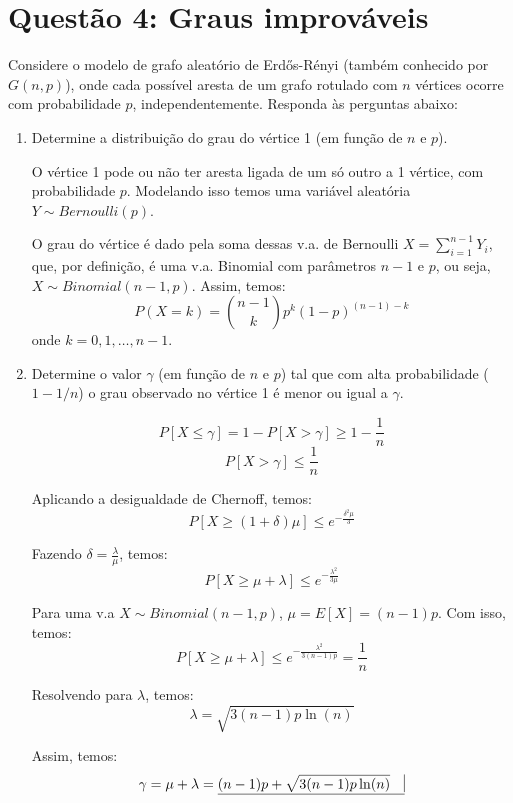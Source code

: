 \documentclass[12 pt]{article}
\begin{document}
\section*{Questão 4: Graus improváveis}

Considere o modelo de grafo aleatório de Erdős-Rényi (também conhecido por $G(n, p)$), onde cada possível aresta de um grafo rotulado com $n$ vértices ocorre com probabilidade $p$, independentemente. Responda às perguntas abaixo:

\begin{enumerate}
    \item Determine a distribuição do grau do vértice 1 (em função de $n$ e $p$).
    \begin{tcolorbox}[colframe=black, title=Resposta:]
        O vértice 1 pode ou não ter aresta ligada de um só outro a 1 vértice, com probabilidade $p$. Modelando isso temos uma variável aleatória $Y \sim Bernoulli(p)$.
        
        O grau do vértice é dado pela soma dessas v.a. de Bernoulli $X = \sum_{i=1}^{n-1} Y_i$, que, por definição, é uma v.a. Binomial com parâmetros $n-1$ e $p$, ou seja, $X \sim Binomial(n-1, p)$.
        Assim, temos:
        $$
        P(X = k) = \binom{n-1}{k} p^k (1-p)^{(n-1)-k}
        $$
        onde $k = 0, 1, \dots, n-1$.
        

    \end{tcolorbox}
    \item Determine o valor $\gamma$ (em função de $n$ e $p$) tal que com alta probabilidade ($1 - 1/n$) o grau observado no vértice 1 é menor ou igual a $\gamma$.
    \begin{tcolorbox}[colframe=black, title=Resposta:]
        $$P[X \leq \gamma] = 1 - P[X > \gamma] \geq 1 - \frac{1}{n}$$
        $$P[X > \gamma] \leq \frac{1}{n}$$

        Aplicando a desigualdade de Chernoff, temos:
        $$P[X \geq (1+\delta)\mu] \leq e^{-\frac{\delta^2\mu}{3}}$$

        Fazendo $\delta = \frac{\lambda}{\mu}$, temos:
        $$P[X \geq \mu + \lambda] \leq e^{-\frac{\lambda^2}{3\mu}}$$

        Para uma v.a $X \sim Binomial(n-1, p)$, $\mu = E[X] = (n-1)p$. Com isso, temos:
        $$P[X \geq \mu + \lambda] \leq e^{-\frac{\lambda^2}{3(n-1)p}}=\frac{1}{n}$$

        Resolvendo para $\lambda$, temos:
        $$\lambda = \sqrt{3(n-1)p\ln(n)}$$

        Assim, temos:
        $$\gamma = \mu + \lambda = \underline{(n-1)p + \sqrt{3(n-1)p\ln(n)} \quad \vline}$$


    \end{tcolorbox}
\end{enumerate}
\end{document}

